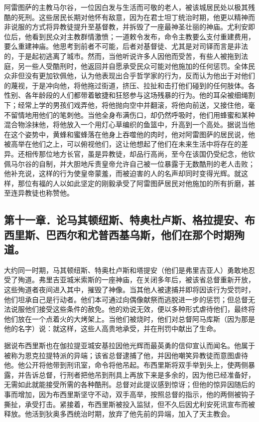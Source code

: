 阿雷图萨的主教马尔谷，一位因白发与生活而可敬的老人，被该城居民处以极其残酷的死刑。这些居民长期对他怀有敌意，因为在君士坦丁统治时期，他更以精神而非说服的方式将异教徒提升至基督教，并拆毁了一座最神圣壮丽的神庙。尤利安即位后，他看到民众对主教群情激愤；一道敕令发布，命令主教要么支付重建费用，要么重建神庙。他思考到前者不可能，后者对基督徒、尤其是对司铎而言是非法的，于是起初逃离了城市。然而，当他听说许多人因他而受苦，有些人被拖到法庭，另一些人受酷刑时，他返回并自愿承受民众可能对他施加的任何惩罚。全体民众非但没有更加钦佩他，认为他表现出合乎哲学家的行为，反而认为他出于对他们的蔑视，于是冲向他，将他拖过街道，挤压、拉扯和击打他们碰到的任何肢体。各性别、各年龄段的人们都带着敏捷和狂怒参与这场残暴的行为。他的耳朵被细绳割下；经常上学的男孩们戏弄他，将他抛向空中并翻滚，将他向前送，又接住他，毫不留情地用他们的笔刺他。当他全身布满伤口，却仍然呼吸时，他们用蜂蜜和某种混合物涂抹他，将他放入一个用灯心草编织的鱼篮中，升高到一个高处。据说当他在这个姿势中，黄蜂和蜜蜂落在他身上吞噬他的肉时，他对阿雷图萨的居民说，他被高举在他们之上，可以俯视他们，这让他想起了他们在未来生活中将存在的差异。还相传那位地方长官，虽是异教徒，却品行高尚，至今在该国仍受纪念，他钦佩马尔谷的自制，并大胆地斥责皇帝允许自己被一位暴露于无数酷刑的老人击败；他补充说，这样的行为使皇帝蒙羞，而被迫害的人的名声却同时变得光辉。就这样，那位有福的人以如此坚定的刚毅承受了阿雷图萨居民对他施加的所有折磨，甚至连异教徒也称赞他。\par


\subsection{第十一章．论马其顿纽斯、特奥杜卢斯、格拉提安、布西里斯、巴西尔和尤普西基乌斯，他们在那个时期殉道。}

大约同一时期，马其顿纽斯、特奥杜卢斯和塔提安（他们是弗里吉亚人）勇敢地忍受了殉道。弗里吉亚城米索斯的一座神庙，在关闭多年后，被该省总督重新开放，这些殉道者夜间进入其中，摧毁了神像。当其他人被逮捕并即将因该行为受罚时，他们坦承自己是行动者。他们本可通过向偶像献祭而逃脱进一步的惩罚；但总督无法说服他们接受这些条件的赦免。他的劝说无效，便以多种形式虐待他们，最终将他们放在一个点着火的大烤架上。当他们被烧时，他们对总督阿马库斯（因为那是他的名字）说：就这样，这些人高贵地承受，并在刑罚中献出了生命。\par

据说布西里斯也在伽拉提亚城安基拉因他光辉而最英勇的信仰宣认而闻名。他属于被称为恩克拉提特派的异端；该省总督逮捕了他，并因他嘲笑异教徒而意图虐待他。他公开将他带到刑讯室，命令将他吊起。布西里斯将双手举到头上，使两侧暴露，并告诉总督，行刑者把他吊到刑具上再放下来是多余的，因为他已经准备好，无需如此就能接受所需的各种酷刑。总督对此提议感到惊讶；但他的惊异因随后的事而增加，因为布西里斯坚守不动，双手高举，按照总督的指示，他的两侧被钩子撕扯，承受打击。紧接着，布西里斯被投入监狱，但不久后因尤利安死讯宣布而被释放。他活到狄奥多西统治时期，放弃了他先前的异端，加入了天主教会。\par

